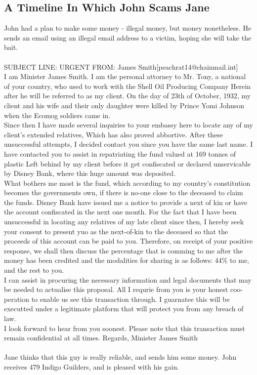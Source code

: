 \documentclass{article}
\begin{document}
\subsection{A Timeline In Which John Scams Jane}


John had a plan to make some money {-} illegal money, but money nonetheless.
He sends an email using an illegal email address to a victim, hoping she will take the bait.
\\\\
SUBJECT LINE: URGENT
FROM: James Smith[peachrat14@chainmail.int]
\\
I am Minister James Smith.
I am the personal attorney to Mr. Tony, a national of your country, who used to work with the Shell Oil Producing Company
Herein after he will be referred to as my client.
On the day of 23th of October, 1932, my client and his wife and their only daughter were killed by Prince Yomi Johnson when the Ecomog soldiers came in.
\\
Since then I have made several inquiries to your embassy here to locate any of my client's extended relatives, Which has also proved abbortive.
After these unsuccessful attempts, I decided contact you since you have the same last name.
I have contacted you to assist in repatriating the fund valued at 169 tonnes of plastic Left behind by my client before it get confiscated or declared unservicable by Disney Bank, where this huge amount was deposited.
\\
What bothers me most is the fund, which according to my country's constitution becomes the governments own, if there is no{-}one close to the deceased to claim the funds.
Disney Bank have issued me a notice to provide a next of kin or have the account confiscated in the next one month.
For the fact that I have been unsuccessful in locating any relatives of my late client since then, I hereby seek your consent to present yuo as the next{-}of{-}kin to the deceased so that the proceeds of this account can be paid to you.
Therefore, on receipt of your positive response, we shall then discuss the percentage that is comming to me after the money has been credited and the modalities for sharing is as follows: 44\% to me, and the rest to you.
\\
I can assist in procuring the necessary information and legal documents that may be needed to actualise this proposal.
All I requrie from you is your honest coo{-}peration to enable us see this transaction through.
I guarnatee this will be executted under a legitimate platform that will protect you from any breach of law.
\\
I look forward to hear from you soonest.
Please note that this transaction must remain confidential at all times.
Regards, Minister James Smith
\\\\
Jane thinks that this guy is really reliable, and sends him some money.
John receives 479 Indigo Guilders, and is pleased with his gain.
\end{document}

